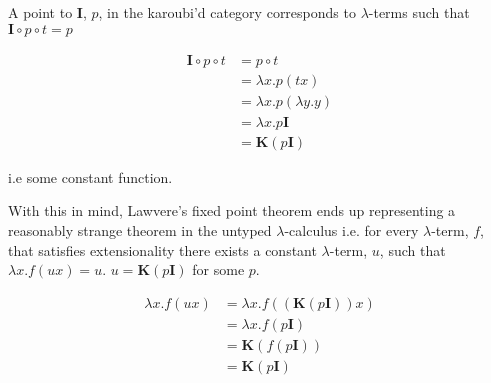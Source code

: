 \documentclass[a4paper,10pt]{article}
\begin{document}
A point to \textbf{I}, $p$, in the karoubi'd category corresponds to $\lambda$-terms such
that $\textbf{I} \circ p \circ t = p$

\begin{align*}
    \textbf{I} \circ p \circ t &= p \circ t \\
    &= \lambda x . p (t x) \\
    &= \lambda x . p (\lambda y . y) \\
    &= \lambda x . p \textbf{I} \\
    &= \textbf{K} (p \textbf{I})
\end{align*}

i.e some constant function.

With this in mind, Lawvere's fixed point theorem ends up representing a
reasonably strange theorem in the untyped $\lambda$-calculus i.e. for every
$\lambda$-term, $f$, that satisfies extensionality there exists a constant
$\lambda$-term, $u$, such that $\lambda x . f (u x) = u$. $u =
\textbf{K}(p\textbf{I})$ for some $p$.

\begin{align*}
    \lambda x . f (u x ) &= \lambda x . f(( \textbf{K} (p \textbf{I})) x) \\
    &= \lambda x . f(p \textbf{I}) \\
    &= \textbf{K} (f (p \textbf{I})) \\
    &= \textbf{K} (p \textbf{I})
\end{align*}
\end{document}
